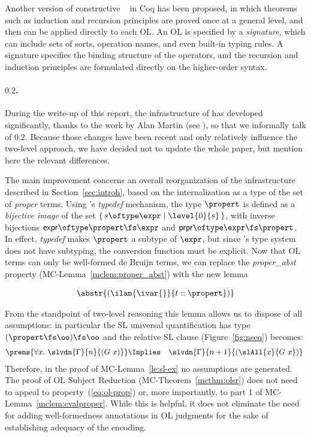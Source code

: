 \documentclass[final]{svjour3}
\begin{document}
Another version of constructive \hybrid~\cite{CapFel06LC} in Coq has
been proposed, in which theorems such as induction and recursion
principles are proved once at a general level, and then can be applied
directly to each OL\@.  An OL is specified by a \emph{signature}, which
can include sets of sorts, operation names, and even built-in typing
rules.  A signature specifies the binding structure of the operators,
and the recursion and induction principles are formulated directly on
the higher-order syntax.

\paragraph{\hybrid $0.2$.}
\label{pa:ho2}


During the
write-up of this report, the infrastructure of
\hybrid has developed significantly, thanks to the work by Alan
Martin (see \cite{MMF07}), so that we informally talk of \hybrid $0.2$.
Because those changes have been recent and only relatively
influence the two-level approach, we have decided not to update the
whole paper, but mention here the relevant differences.

The main improvement concerns an overall reorganization of the
infrastructure described in Section~\ref{sec:introh}, based on the
internalization as a type of the set of \emph{proper} terms.  Using
\HOL's \emph{typedef} mechanism, the type $\propert$ is defined
as a \emph{bijective image} of the set \( \{\, s \oftype \expr
\mid \level{0}{s} \,\} \), with inverse bijections \( \mathsf{expr}
\oftype \propert \fs \expr \) and \( \mathsf{prpr} \oftype
\expr \fs \propert \).  In effect, \emph{typedef} makes
$\propert$ a subtype of $\expr$, but since \HOL's type
system does not have subtyping, the conversion function must be
explicit.  Now that OL terms can only be well-formed de Bruijn terms,
we can replace the \emph{proper\_abst} property
(MC-Lemma~\ref{mclem:proper_abst}) with the new lemma
\begin{mclemma}
\begin{eqnarray*}
    \abstr{(\ilam{\ivar{}}{t :: \propert})}
  \end{eqnarray*}
\end{mclemma}


From the standpoint of two-level reasoning this lemma allows us to
dispose of all  assumptions: in particular the SL
universal quantification has type $(\propert\fs\oo)\fs\oo$ and the
relative SL clause (Figure~\ref{fig:nseq}) becomes:
\begin{eqnarray*}
  \prems{\forall x.\ \slvdn{\Gamma}{n}{(G\ x)}  } & \Implies &
\slvdn{\Gamma}{n+1}{(\slAll{x}{G\ x})}\
\end{eqnarray*}
Therefore, in the proof of MC-Lemma~\ref{le:sl-ex} no 
assumptions are generated. The proof of OL Subject Reduction
(MC-Theorem~\ref{mcthm:olsr}) does not need to appeal to
property~(\ref{eq:ol-prop}) or, more importantly, to part 1 of
MC-Lemma~\ref{mclem:evalproper}.
While this is helpful, it does not eliminate the need for adding
well-formedness annotations in OL judgments for the sake of
establishing  adequacy of the encoding.
\end{document}
